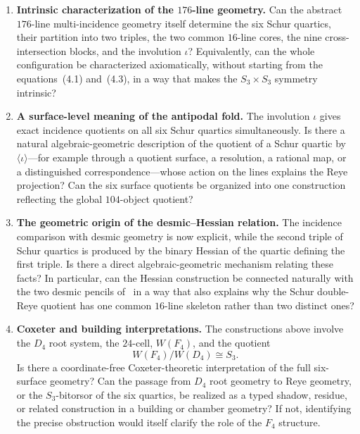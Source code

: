 \documentclass[10pt]{article}
\begin{document}
\begin{enumerate}

\item \textbf{Intrinsic characterization of the $176$-line geometry.}
Can the abstract $176$-line multi-incidence geometry itself determine the
six Schur quartics, their partition into two triples, the two common
$16$-line cores, the nine cross-intersection blocks, and the involution
$\iota$?  Equivalently, can the whole configuration be characterized
axiomatically, without starting from the equations~(4.1) and~(4.3), in a
way that makes the $S_3\times S_3$ symmetry intrinsic?

\item \textbf{A surface-level meaning of the antipodal fold.}
The involution $\iota$ gives exact incidence quotients on all six Schur
quartics simultaneously.  Is there a natural algebraic-geometric
description of the quotient of a Schur quartic by
$\langle\iota\rangle$---for example through a quotient surface, a
resolution, a rational map, or a distinguished correspondence---whose
action on the lines explains the Reye projection?  Can the six surface
quotients be organized into one construction reflecting the global
$104$-object quotient?

\item \textbf{The geometric origin of the desmic--Hessian relation.}
The incidence comparison with desmic geometry is now explicit, while the
second triple of Schur quartics is produced by the binary Hessian of the
quartic defining the first triple.  Is there a direct algebraic-geometric
mechanism relating these facts?  In particular, can the Hessian construction
be connected naturally with the two desmic pencils of~\cite{DK25} in a way
that also explains why the Schur double-Reye quotient has one common
$16$-line skeleton rather than two distinct ones?

\item \textbf{Coxeter and building interpretations.}
The constructions above involve the $D_4$ root system, the $24$-cell,
$W(F_4)$, and the quotient
\[
W(F_4)/W(D_4)\cong S_3.
\]
Is there a coordinate-free Coxeter-theoretic interpretation of the full
six-surface geometry?  Can the passage from $D_4$ root geometry to Reye
geometry, or the $S_3$-bitorsor of the six quartics, be realized as a typed
shadow, residue, or related construction in a building or chamber geometry?
If not, identifying the precise obstruction would itself clarify the role of
the $F_4$ structure.

\end{enumerate}
\end{document}
